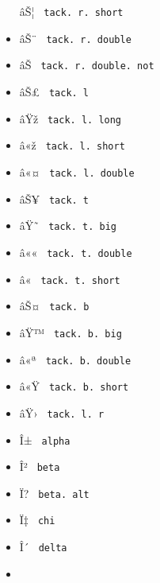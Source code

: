 \begin{itemize}
  \label{symbol-tack.r.short}{{ âŠ¦ }
  \texttt{\ tack.\ r.\ short\ }}
\item
  \label{symbol-tack.r.double}{{ âŠ¨ }
  \texttt{\ tack.\ r.\ double\ }}
\item
  \label{symbol-tack.r.double.not}{{ âŠ­ }
  \texttt{\ tack.\ r.\ double.\ not\ }}
\item
  \label{symbol-tack.l}{{ âŠ£ } \texttt{\ tack.\ l\ }}
\item
  \label{symbol-tack.l.long}{{ âŸž }
  \texttt{\ tack.\ l.\ long\ }}
\item
  \label{symbol-tack.l.short}{{ â«ž }
  \texttt{\ tack.\ l.\ short\ }}
\item
  \label{symbol-tack.l.double}{{ â«¤ }
  \texttt{\ tack.\ l.\ double\ }}
\item
  \label{symbol-tack.t}{{ âŠ¥ } \texttt{\ tack.\ t\ }}
\item
  \label{symbol-tack.t.big}{{ âŸ˜ }
  \texttt{\ tack.\ t.\ big\ }}
\item
  \label{symbol-tack.t.double}{{ â«« }
  \texttt{\ tack.\ t.\ double\ }}
\item
  \label{symbol-tack.t.short}{{ â« }
  \texttt{\ tack.\ t.\ short\ }}
\item
  \label{symbol-tack.b}{{ âŠ¤ } \texttt{\ tack.\ b\ }}
\item
  \label{symbol-tack.b.big}{{ âŸ™ }
  \texttt{\ tack.\ b.\ big\ }}
\item
  \label{symbol-tack.b.double}{{ â«ª }
  \texttt{\ tack.\ b.\ double\ }}
\item
  \label{symbol-tack.b.short}{{ â«Ÿ }
  \texttt{\ tack.\ b.\ short\ }}
\item
  \label{symbol-tack.l.r}{{ âŸ› }
  \texttt{\ tack.\ l.\ r\ }}
\item
  \label{symbol-alpha}{{ Î± } \texttt{\ alpha\ }}
\item
  \label{symbol-beta}{{ Î² } \texttt{\ beta\ }}
\item
  \label{symbol-beta.alt}{{ Ï? } \texttt{\ beta.\ alt\ }}
\item
  \label{symbol-chi}{{ Ï‡ } \texttt{\ chi\ }}
\item
  \label{symbol-delta}{{ Î´ } \texttt{\ delta\ }}
\item

\end{itemize}

